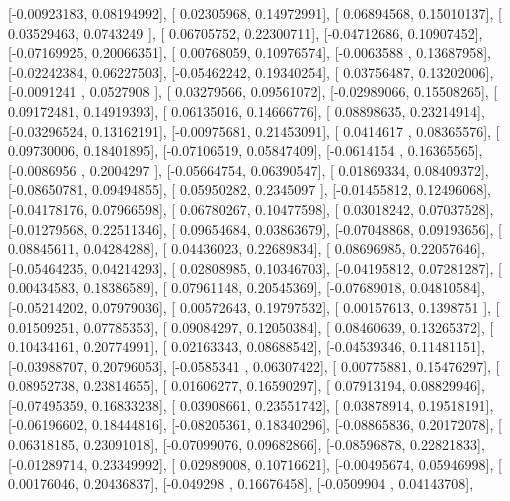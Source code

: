 \documentclass{article}
\begin{document}
       [-0.00923183,  0.08194992],
       [ 0.02305968,  0.14972991],
       [ 0.06894568,  0.15010137],
       [ 0.03529463,  0.0743249 ],
       [ 0.06705752,  0.22300711],
       [-0.04712686,  0.10907452],
       [-0.07169925,  0.20066351],
       [ 0.00768059,  0.10976574],
       [-0.0063588 ,  0.13687958],
       [-0.02242384,  0.06227503],
       [-0.05462242,  0.19340254],
       [ 0.03756487,  0.13202006],
       [-0.0091241 ,  0.0527908 ],
       [ 0.03279566,  0.09561072],
       [-0.02989066,  0.15508265],
       [ 0.09172481,  0.14919393],
       [ 0.06135016,  0.14666776],
       [ 0.08898635,  0.23214914],
       [-0.03296524,  0.13162191],
       [-0.00975681,  0.21453091],
       [ 0.0414617 ,  0.08365576],
       [ 0.09730006,  0.18401895],
       [-0.07106519,  0.05847409],
       [-0.0614154 ,  0.16365565],
       [-0.0086956 ,  0.2004297 ],
       [-0.05664754,  0.06390547],
       [ 0.01869334,  0.08409372],
       [-0.08650781,  0.09494855],
       [ 0.05950282,  0.2345097 ],
       [-0.01455812,  0.12496068],
       [-0.04178176,  0.07966598],
       [ 0.06780267,  0.10477598],
       [ 0.03018242,  0.07037528],
       [-0.01279568,  0.22511346],
       [ 0.09654684,  0.03863679],
       [-0.07048868,  0.09193656],
       [ 0.08845611,  0.04284288],
       [ 0.04436023,  0.22689834],
       [ 0.08696985,  0.22057646],
       [-0.05464235,  0.04214293],
       [ 0.02808985,  0.10346703],
       [-0.04195812,  0.07281287],
       [ 0.00434583,  0.18386589],
       [ 0.07961148,  0.20545369],
       [-0.07689018,  0.04810584],
       [-0.05214202,  0.07979036],
       [ 0.00572643,  0.19797532],
       [ 0.00157613,  0.1398751 ],
       [ 0.01509251,  0.07785353],
       [ 0.09084297,  0.12050384],
       [ 0.08460639,  0.13265372],
       [ 0.10434161,  0.20774991],
       [ 0.02163343,  0.08688542],
       [-0.04539346,  0.11481151],
       [-0.03988707,  0.20796053],
       [-0.0585341 ,  0.06307422],
       [ 0.00775881,  0.15476297],
       [ 0.08952738,  0.23814655],
       [ 0.01606277,  0.16590297],
       [ 0.07913194,  0.08829946],
       [-0.07495359,  0.16833238],
       [ 0.03908661,  0.23551742],
       [ 0.03878914,  0.19518191],
       [-0.06196602,  0.18444816],
       [-0.08205361,  0.18340296],
       [-0.08865836,  0.20172078],
       [ 0.06318185,  0.23091018],
       [-0.07099076,  0.09682866],
       [-0.08596878,  0.22821833],
       [-0.01289714,  0.23349992],
       [ 0.02989008,  0.10716621],
       [-0.00495674,  0.05946998],
       [ 0.00176046,  0.20436837],
       [-0.049298  ,  0.16676458],
       [-0.0509904 ,  0.04143708],
\end{document}
